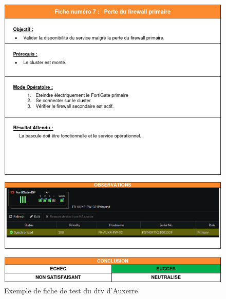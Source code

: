 \documentclass[12pt, oneside, a4paper, titlepage]{report}
\begin{document}
\begin{figure}[h!]
    \centering
    \includegraphics[width = \linewidth]{img/doc-hy/dtv.png}
    \caption{Exemple de fiche de test du \gls{dtv} d'Auxerre}%
    \label{fig:doc-hy/dtv}
\end{figure}
\end{document}

